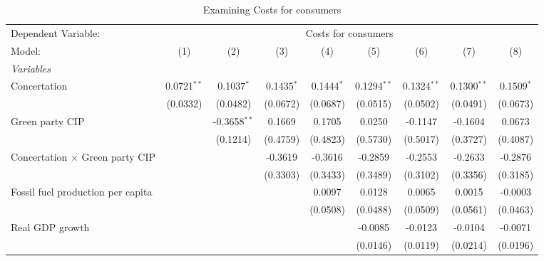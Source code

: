 
\begin{table}[htbp]
   \caption{Examining Costs for consumers}
   \centering
   \begin{tabular}{lcccccccc}
      \tabularnewline \midrule \midrule
      Dependent Variable: & \multicolumn{8}{c}{Costs for consumers}\\
      Model:                                  & (1)           & (2)            & (3)          & (4)          & (5)           & (6)           & (7)           & (8)\\  
      \midrule
      \emph{Variables}\\
      Concertation                            & 0.0721$^{**}$ & 0.1037$^{*}$   & 0.1435$^{*}$ & 0.1444$^{*}$ & 0.1294$^{**}$ & 0.1324$^{**}$ & 0.1300$^{**}$ & 0.1509$^{*}$\\   
                                              & (0.0332)      & (0.0482)       & (0.0672)     & (0.0687)     & (0.0515)      & (0.0502)      & (0.0491)      & (0.0673)\\   
      Green party CIP                         &               & -0.3658$^{**}$ & 0.1669       & 0.1705       & 0.0250        & -0.1147       & -0.1604       & 0.0673\\   
                                              &               & (0.1214)       & (0.4759)     & (0.4823)     & (0.5730)      & (0.5017)      & (0.3727)      & (0.4087)\\   
      Concertation $\times$ Green party CIP   &               &                & -0.3619      & -0.3616      & -0.2859       & -0.2553       & -0.2633       & -0.2876\\   
                                              &               &                & (0.3303)     & (0.3433)     & (0.3489)      & (0.3102)      & (0.3356)      & (0.3185)\\   
      Fossil fuel production per capita       &               &                &              & 0.0097       & 0.0128        & 0.0065        & 0.0015        & -0.0003\\   
                                              &               &                &              & (0.0508)     & (0.0488)      & (0.0509)      & (0.0561)      & (0.0463)\\   
      Real GDP growth                         &               &                &              &              & -0.0085       & -0.0123       & -0.0104       & -0.0071\\   
                                              &               &                &              &              & (0.0146)      & (0.0119)      & (0.0214)      & (0.0196)\\   

\end{tabular}
\end{table}
